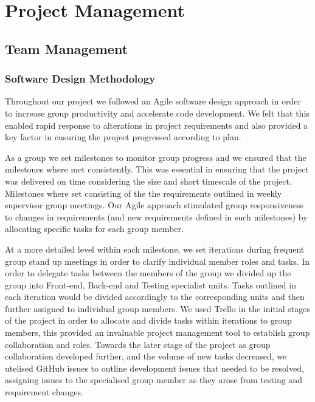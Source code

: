 \section{Project Management}

\subsection{Team Management}
\subsubsection{Software Design Methodology}
Throughout our project we followed an Agile software design approach in order to increase group productivity and accelerate code development. We felt that this enabled rapid response to alterations in project requirements and also provided a key factor in ensuring the project progressed according to plan.

As a group we set milestones to monitor group progress and we ensured that the milestones where met consistently. This was essential in ensuring that the project was delivered on time considering the size and short timescale of the project. Milestones where set consisting of the the requirements outlined in weekly supervisor group meetings. Our Agile approach stimulated group responsiveness to changes in requirements (and new requirements defined in such milestones) by allocating specific tasks for each group member. 

At a more detailed level within each milestone, we set iterations during frequent group stand up meetings in order to clarify individual member roles and tasks. In order to delegate tasks between the members of the group we divided up the group into Front-end, Back-end and Testing specialist units. Tasks outlined in each iteration would be divided accordingly to the corresponding units and then further assigned to individual group members. We used Trello in the initial stages of the project in order to allocate and divide tasks within iterations to group members, this provided an invaluable project management tool to establish group collaboration and roles. Towards the later stage of the project as group collaboration developed further, and the volume of new tasks decreased, we utelised GitHub issues to outline development issues that needed to be resolved, assigning issues to the specialised group member as they arose from testing and requirement changes.

